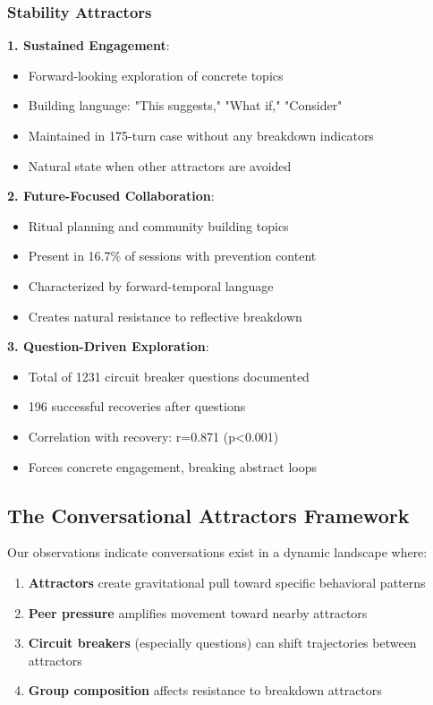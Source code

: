 \documentclass[11pt,letterpaper]{article}
\newcommand{\exponedataQuestionCorrelation}{0.871}
\newcommand{\exponedataQuestionPValue}{p<0.001}
\newcommand{\exponedataNegativeCase}{175}
\newcommand{\exponedataTotalQuestions}{1231}
\newcommand{\exponedataTotalRecoveries}{196}
\newcommand{\exponedataPreventionContentPercentage}{16.7\%}
\begin{document}
\subsubsection{Stability Attractors}

\textbf{1. Sustained Engagement}:
\begin{itemize}
    \item Forward-looking exploration of concrete topics
    \item Building language: "This suggests," "What if," "Consider"
    \item Maintained in \exponedataNegativeCase{}-turn case without any breakdown indicators
    \item Natural state when other attractors are avoided
\end{itemize}

\textbf{2. Future-Focused Collaboration}:
\begin{itemize}
    \item Ritual planning and community building topics
    \item Present in \exponedataPreventionContentPercentage{} of sessions with prevention content
    \item Characterized by forward-temporal language
    \item Creates natural resistance to reflective breakdown
\end{itemize}

\textbf{3. Question-Driven Exploration}:
\begin{itemize}
    \item Total of \exponedataTotalQuestions{} circuit breaker questions documented
    \item \exponedataTotalRecoveries{} successful recoveries after questions
    \item Correlation with recovery: r=\exponedataQuestionCorrelation{} (\exponedataQuestionPValue{})
    \item Forces concrete engagement, breaking abstract loops
\end{itemize}

\subsection{The Conversational Attractors Framework}

Our observations indicate conversations exist in a dynamic landscape where:

\begin{enumerate}
    \item \textbf{Attractors} create gravitational pull toward specific behavioral patterns
    \item \textbf{Peer pressure} amplifies movement toward nearby attractors
    \item \textbf{Circuit breakers} (especially questions) can shift trajectories between attractors
    \item \textbf{Group composition} affects resistance to breakdown attractors
\end{enumerate}
\end{document}
